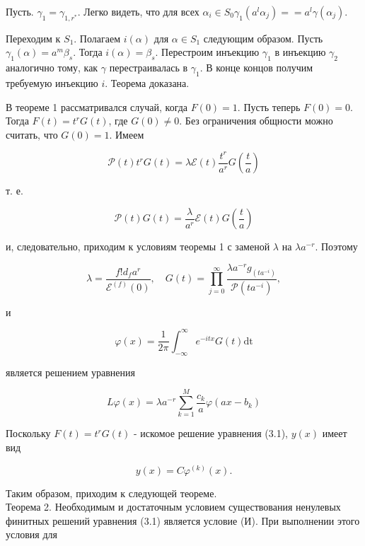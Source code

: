\documentclass[10pt]{article}
\begin{document}
Пусть. $\gamma_{1}=\gamma_{1, r^{*}}$. Легко видеть, что для всех $\alpha_{i} \in S_{0} \gamma_{1}\left(a^{l} \alpha_{j}\right)= =a^{l} \gamma\left(\alpha_{j}\right)$.

Переходим к $S_{1}$. Полагаем $i(\alpha)$ для $\alpha \in S_{1}$ следующим образом. Пусть $\gamma_{1}(\alpha)=a^{m} \beta_{s}$. Тогда $i(\alpha)=\beta_{s}$. Перестроим инъекцию $\gamma_{1}$ в инъекцию $\gamma_{2}$ аналогично тому, как $\gamma$ перестраивалась в $\gamma_{1}$. В конце концов получим требуемую инъекцию $i$. Теорема доказана.

В теореме 1 рассматривался случай, когда $F(0)=1$. Пусть теперь $F(0)=0$. Тогда $F(t)=t^{r} G(t)$, где $G(0) \neq 0$. Без ограничения общности можно считать, что $G(0)=1$. Имеем

$$
\mathscr{P}(t) t^{r} G(t)=\lambda \mathscr{E}(t) \frac{t^{r}}{a^{r}} G\left(\frac{t}{a}\right)
$$

т. е.


\begin{equation*}
\mathscr{P}(t) G(t)=\frac{\lambda}{a^{r}} \mathscr{E}(t) G\left(\frac{t}{a}\right) \tag{3.9}
\end{equation*}


и, следовательно, приходим к условиям теоремы 1 с заменой $\lambda$ на $\lambda a^{-r}$. Поэтому

$$
\lambda=\frac{f!d_{f} a^{r}}{\mathscr{E}^{(f)}(0)}, \quad G(t)=\prod_{j=0}^{\infty} \frac{\lambda a^{-r} g_{\left(t a^{-i}\right)}}{\mathscr{P}\left(t a^{-i}\right)},
$$

и


\begin{equation*}
\varphi(x)=\frac{1}{2 \pi} \int_{-\infty}^{\infty} e^{-i t x} G(t) \mathrm{dt} \tag{3.10}
\end{equation*}


является решением уравнения


\begin{equation*}
L \varphi(x)=\lambda a^{-r} \sum_{k=1}^{M} \frac{c_{k}}{a} \varphi\left(a x-b_{k}\right) \tag{3.11}
\end{equation*}


Поскольку $F(t)=t^{r} G(t)$ - искомое решение уравнения (3.1), $y(x)$ имеет вид


\begin{equation*}
y(x)=C \varphi^{(k)}(x) . \tag{3.12}
\end{equation*}


Таким образом, приходим к следующей теореме.\\
Теорема 2. Необходимым и достаточным условием существования ненулевых финитных решений уравнения (3.1) является условие (И). При выполнении этого условия для
\end{document}

